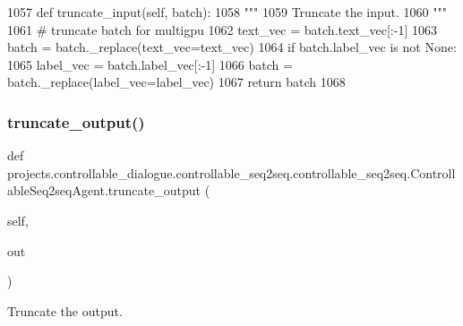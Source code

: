 \begin{DoxyCode}
1057     \textcolor{keyword}{def }truncate\_input(self, batch):
1058         \textcolor{stringliteral}{"""}
1059 \textcolor{stringliteral}{        Truncate the input.}
1060 \textcolor{stringliteral}{        """}
1061         \textcolor{comment}{# truncate batch for multigpu}
1062         text\_vec = batch.text\_vec[:-1]
1063         batch = batch.\_replace(text\_vec=text\_vec)
1064         \textcolor{keywordflow}{if} batch.label\_vec \textcolor{keywordflow}{is} \textcolor{keywordflow}{not} \textcolor{keywordtype}{None}:
1065             label\_vec = batch.label\_vec[:-1]
1066             batch = batch.\_replace(label\_vec=label\_vec)
1067         \textcolor{keywordflow}{return} batch
1068 
\end{DoxyCode}
\mbox{\label{classprojects_1_1controllable__dialogue_1_1controllable__seq2seq_1_1controllable__seq2seq_1_1ControllableSeq2seqAgent_a4b656f8d8634a71088b3cb9e719f3629}} 
\subsubsection{\texorpdfstring{truncate\+\_\+output()}{truncate\_output()}}
{\footnotesize\ttfamily def projects.\+controllable\+\_\+dialogue.\+controllable\+\_\+seq2seq.\+controllable\+\_\+seq2seq.\+Controllable\+Seq2seq\+Agent.\+truncate\+\_\+output (\begin{DoxyParamCaption}\item[{}]{self,  }\item[{}]{out }\end{DoxyParamCaption})}

\begin{DoxyVerb}Truncate the output.
\end{DoxyVerb}
 


